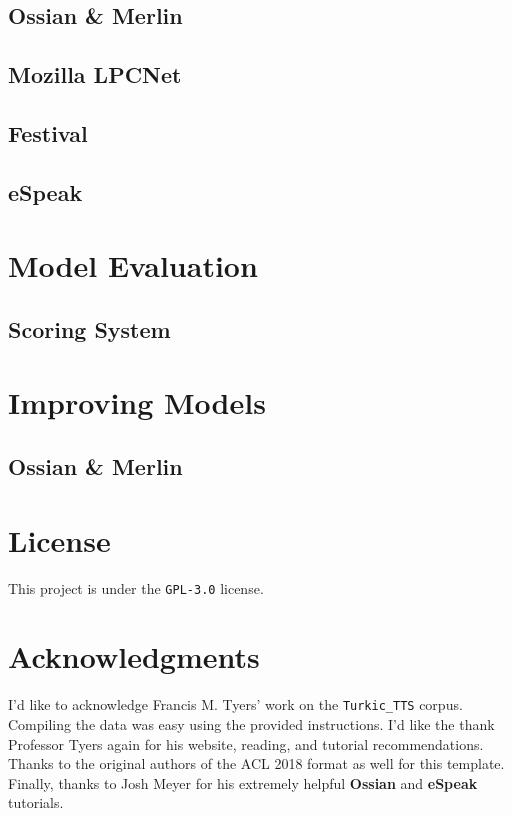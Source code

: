 \documentclass[11pt,a4paper]{article}
\begin{document}
\subsection{Ossian \& Merlin}
\subsection{Mozilla LPCNet}
\subsection{Festival}
\subsection{eSpeak}

\section{Model Evaluation}\label{ssec:evaluation}

\subsection{Scoring System}\label{ssec:score}

\section{Improving Models}\label{sec:improving}
\subsection{Ossian \& Merlin}\label{ssec:improveOssian}

\section*{License}
This project is under the \texttt{GPL-3.0} license.

\section*{Acknowledgments}
I'd like to acknowledge Francis M. Tyers' work on the \texttt{Turkic\_TTS} corpus. Compiling the data was easy using the provided instructions. I'd like the thank Professor Tyers again for his website, reading, and tutorial recommendations. Thanks to the original authors of the ACL 2018 format as well for this template. Finally, thanks to Josh Meyer for his extremely helpful \textbf{Ossian} and \textbf{eSpeak} tutorials.

%
%


\end{document}
